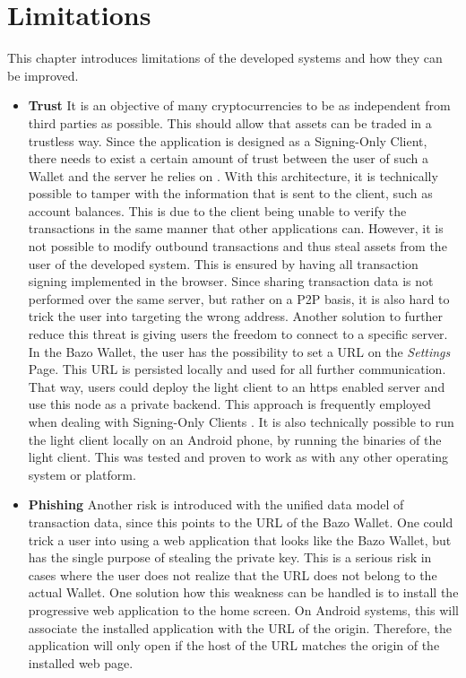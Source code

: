 \section{Limitations}\label{limitations}
This chapter introduces limitations of the developed systems and how they can be improved.
\begin{itemize}
\item \textbf{Trust}
It is an objective of many cryptocurrencies to be as independent from third parties as possible. This should allow that assets can be traded in a trustless way. Since the application is designed as a Signing-Only Client, there needs to exist a certain amount of trust between the user of such a Wallet and the server he relies on \cite{bitcoinclients}. With this architecture, it is technically possible to tamper with the information that is sent to the client, such as account balances. This is due to the client being unable to verify the transactions in the same manner that other applications can. However, it is not possible to modify outbound transactions and thus steal assets from the user of the developed system.
This is ensured by having all transaction signing implemented in the browser. Since sharing transaction data is not performed over the same server, but rather on a P2P basis, it is also hard to trick the user into targeting the wrong address.
Another solution to further reduce this threat is giving users the freedom to connect to a specific server. In the Bazo Wallet, the user has the possibility to set a URL on the \textit{Settings} Page. This URL is persisted locally and used for all further communication. That way, users could deploy the light client to an https enabled server and use this node as a private backend. This approach is frequently employed when dealing with Signing-Only Clients \cite{bitcoinclients}. It is also technically possible to run the light client locally on an Android phone, by running the binaries of the light client. This was tested and proven to work as with any other operating system or platform.
\item \textbf{Phishing}
Another risk is introduced with the unified data model of transaction data, since this points to the URL of the Bazo Wallet. One could trick a user into using a web application that looks like the Bazo Wallet, but has the single purpose of stealing the private key. This is a serious risk in cases where the user does not realize that the URL does not belong to the actual Wallet.
One solution how this weakness can be handled is to install the progressive web application to the home screen. On Android systems, this will associate the installed application with the URL of the origin. Therefore, the application will only open if the host of the URL matches the origin of the installed web page.

\end{itemize}
